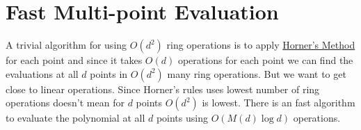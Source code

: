 
\section{Fast Multi-point Evaluation}

A trivial algorithm for using $O(d^2)$ ring operations is to apply \hyperref[th:horner]{Horner's Method} for each point and since it takes $O(d)$ operations for each point we can find the evaluations at all $d$ points in $O(d^2)$ many ring operations. But we want to get close to linear operations. Since Horner's rules uses lowest number of ring operations doesn't mean for $d$ points $O(d^2)$ is lowest. There is an fast algorithm to evaluate the polynomial at all $d$ points using $O(M(d)\log d)$ operations.